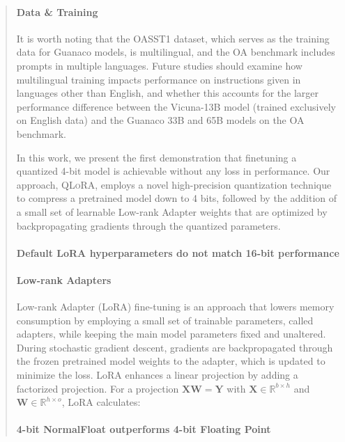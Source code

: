 \begin{quote}
\paragraph{Data \& Training} It is worth noting that the OASST1 dataset, which serves as the training data for {Guanaco} models, is multilingual, and the OA benchmark includes prompts in multiple languages. Future studies should examine how multilingual training impacts performance on instructions given in languages other than English, and whether this accounts for the larger performance difference between the Vicuna-13B model (trained exclusively on English data) and the {Guanaco} 33B and 65B models on the OA benchmark.

In this work, we present the first demonstration that finetuning a quantized 4-bit model is achievable without any loss in performance. Our approach, \textsc{QLoRA}, employs a novel high-precision quantization technique to compress a pretrained model down to 4 bits, followed by the addition of a small set of learnable Low-rank Adapter weights \citep{hu2021lora} that are optimized by backpropagating gradients through the quantized parameters.

\paragraph{Default LoRA hyperparameters do not match 16-bit performance}

\paragraph{Low-rank Adapters} Low-rank Adapter (LoRA) fine-tuning \citep{hu2021lora} is an approach that lowers memory consumption by employing a small set of trainable parameters, called adapters, while keeping the main model parameters fixed and unaltered. During stochastic gradient descent, gradients are backpropagated through the frozen pretrained model weights to the adapter, which is updated to minimize the loss. LoRA enhances a linear projection by adding a factorized projection. For a projection ${\mathbf{X} \mathbf{W} = \mathbf{Y}}$ with $\mathbf{X} \in \mathbb{R}^{b \times h}$ and $\mathbf{W} \in \mathbb{R}^{h \times o}$, LoRA calculates:

\paragraph{4-bit NormalFloat outperforms 4-bit Floating Point} 


\end{quote}
